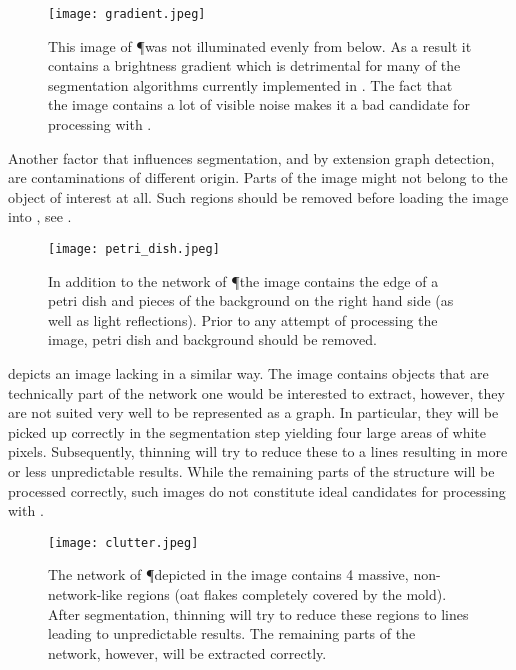	\begin{figure}
		\centering
		\texttt{[image: gradient.jpeg]}
		\caption[\NEFIs caveats: Gradients]{This image of \P was not illuminated evenly from below. As a result it contains a brightness gradient which is detrimental for many of the segmentation algorithms currently implemented in \NEFI. The fact that the image contains a lot of visible noise makes it a bad candidate for processing with \NEFI.}
		\label{fig:sup:gradient}
	\end{figure}

	Another factor that influences segmentation, and by extension graph detection, are contaminations of different origin. Parts of the image might not belong to the object of interest at all. Such regions should be removed before loading the image into \NEFI, see . 

	\begin{figure}
		\centering
		\texttt{[image: petri\_dish.jpeg]}
		\caption[\NEFIs caveats: Non-network objects]{In addition to the network of \P the image contains the edge of a petri dish and pieces of the background on the right hand side (as well as light reflections). Prior to any attempt of processing the image, petri dish and background should be removed.}
		\label{fig:sup:petri_dish}
	\end{figure}

	 depicts an image lacking in a similar way. The image contains objects that are technically part of the network one would be interested to extract, however, they are not suited very well to be represented as a graph. In particular, they will be picked up correctly in the segmentation step yielding four large areas of white pixels. Subsequently, thinning will try to reduce these to a lines resulting in more or less unpredictable results. While the remaining parts of the structure will be processed correctly, such images do not constitute ideal candidates for processing with \NEFI.

	\begin{figure}
		\centering
		\texttt{[image: clutter.jpeg]}
		\caption[\NEFIs caveats: Non-network objects]{The network of \P depicted in the image contains 4 massive, non-network-like regions (oat flakes completely covered by the mold). After segmentation, thinning will try to reduce these regions to lines leading to unpredictable results. The remaining parts of the network, however, will be extracted correctly.}
		\label{fig:sup:clutter}
	\end{figure}

